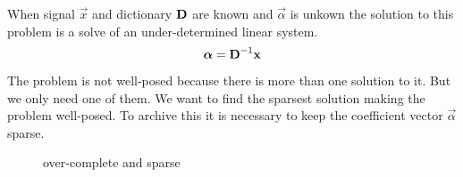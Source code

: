 When signal $\vec{x}$ and dictionary $\boldsymbol{\mathrm{D}}$ are known 
and $\vec{\alpha}$ is unkown the solution to this problem is a solve of an
under-determined linear system.
\begin{equation}
 \boldsymbol{\mathrm{\alpha}} = \boldsymbol{\mathrm{D}}^{-1}\boldsymbol{\mathrm{x}} 
\end{equation}
The problem is not well-posed because there is more than one
solution to it. %
But we only need one of them. We want to find the sparsest
solution making the problem well-posed. To archive this it is necessary to keep
the coefficient vector $\vec{\alpha}$ sparse. 

\begin{figure}[h]
\centering
\hspace{5mm}
\caption{over-complete and sparse}
\label{fig:sparse}
\end{figure}




